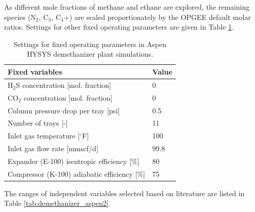 \documentclass[11pt]{report}
\begin{document}
As different mole fractions of methane and ethane are explored, the remaining species (N$_2$, C$_3$, C$_4$+) are scaled proportionately by the OPGEE default molar ratios. Settings for other fixed operating parameters are given in Table \ref{tab:demethanizer_aspen1}. 

\begin{table}
\begin{scriptsize}
\caption{Settings for fixed operating parameters in Aspen HYSYS demethanizer plant simulations.}
\label{tab:demethanizer_aspen1}
\begin{tabular*}{1\columnwidth}{p{}p{}}
\toprule
Fixed variables & Value\\
\midrule
H$_2$S concentration {[}mol. fraction{]} & 0   \\
CO$_2$ concentration {[}mol. fraction{]}                                             & 0       \\
Column pressure drop per tray {[}psi{]}                                 & 0.5    \\
Number of trays {[}-{]}                                                           & 11   \\
Inlet gas temperature {[}$^\circ$F{]}                                                    & 100  \\
Inlet gas flow rate {[}mmscf/d{]}                                                 & 99.8    \\
Expander (E-100) isentropic efficiency {[}\%{]}                                   & 80    \\
Compressor (K-100) adiabatic efficiency {[}\%{]}                                  & 75   \\
\bottomrule
\end{tabular*}
\end{scriptsize}
\end{table}

The ranges of independent variables selected based on literature \cite{Manning1991, luyben2013ngl, nawaz2010synthesis} are listed in Table \ref{tab:demethanizer_aspen2}.
\end{document}
